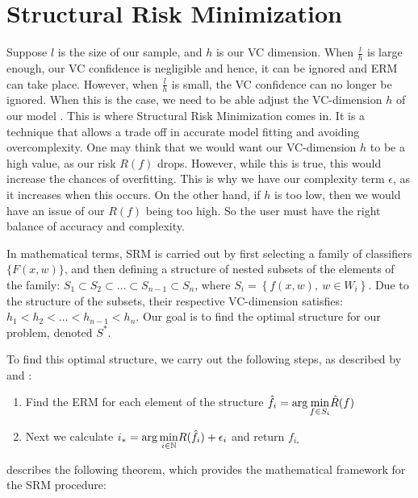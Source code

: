 \section {Structural Risk Minimization} \label{sec:srm} 

Suppose $l$ is the size of our sample, and $h$ is our VC dimension. When $\frac{l}{h}$ is large enough, our VC confidence is negligible and hence, it can be ignored and ERM can take place. However, when $\frac{l}{h}$ is small, the VC confidence can no longer be ignored. When this is the case, we need to be able adjust the VC-dimension $h$ of our model \citep{srmvapnik506}. This is where Structural Risk Minimization comes in. It is a technique that allows a trade off in accurate model fitting and avoiding overcomplexity. One may think that we would want our VC-dimension $h$ to be a high value, as our risk $R(f)$ drops. However, while this is true, this would increase the chances of overfitting. This is why we have our complexity term $\epsilon$, as it increases when this occurs. On the other hand, if $h$ is too low, then we would have an issue of our $R(f)$ being too high. So the user must have the right balance of accuracy and complexity.


In mathematical terms, SRM is carried out by first selecting a family of classifiers $\{F(x,w)\}$, and then defining a structure of nested subsets of the elements of the family: $S_{1}\subset S_{2}\subset\ldots\subset S_{n-1}\subset S_{n}$, where $S_{i}=\left\{ f(x,w),\:w\in W_{i}\right\} $. Due to the structure of the subsets, their respective VC-dimension satisfies: $h_{1}<h_{2}<\ldots<h_{n-1}<h_{n}$. Our goal is to find the optimal structure for our problem, denoted $S^{*}$.


To find this optimal structure, we carry out the following steps, as described by \citet{srmvapnik506} and \citet{srmsewell}:

\begin{enumerate}
\item Find the ERM for each element of the structure $\hat{f_{i}}=\mathrm{arg\,\underset{\mathnormal{f}\in \mathnormal{S_{i}}}{min}}\hat{R}(f)$
\item Next we calculate $i_{*}={\mathrm{{arg\,\underset{\mathnormal{i}\in\mathbb{N}}{min}}}}R(\hat{f_{i}})+\epsilon_{i}$
and return $f_{i_{*}}$
\end{enumerate}


\citet{shawetaylorsrm} describes the following theorem, which provides the mathematical framework for the SRM procedure:

